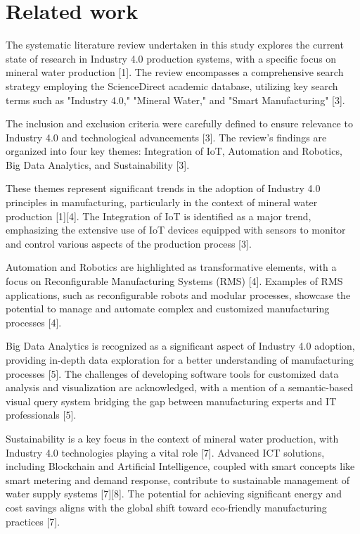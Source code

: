 \documentclass[conference]{IEEEtran}
\begin{document}
\section{Related work}
\label{sec:related_work}
The systematic literature review undertaken in this study explores the current state of research in Industry 4.0 production systems, with a specific focus on mineral water production [1]. The review encompasses a comprehensive search strategy employing the ScienceDirect academic database, utilizing key search terms such as "Industry 4.0," "Mineral Water," and "Smart Manufacturing" [3].

The inclusion and exclusion criteria were carefully defined to ensure relevance to Industry 4.0 and technological advancements [3]. The review's findings are organized into four key themes: Integration of IoT, Automation and Robotics, Big Data Analytics, and Sustainability [3].

These themes represent significant trends in the adoption of Industry 4.0 principles in manufacturing, particularly in the context of mineral water production [1][4]. The Integration of IoT is identified as a major trend, emphasizing the extensive use of IoT devices equipped with sensors to monitor and control various aspects of the production process [3].

Automation and Robotics are highlighted as transformative elements, with a focus on Reconfigurable Manufacturing Systems (RMS) [4]. Examples of RMS applications, such as reconfigurable robots and modular processes, showcase the potential to manage and automate complex and customized manufacturing processes [4].

Big Data Analytics is recognized as a significant aspect of Industry 4.0 adoption, providing in-depth data exploration for a better understanding of manufacturing processes [5]. The challenges of developing software tools for customized data analysis and visualization are acknowledged, with a mention of a semantic-based visual query system bridging the gap between manufacturing experts and IT professionals [5].

Sustainability is a key focus in the context of mineral water production, with Industry 4.0 technologies playing a vital role [7]. Advanced ICT solutions, including Blockchain and Artificial Intelligence, coupled with smart concepts like smart metering and demand response, contribute to sustainable management of water supply systems [7][8]. The potential for achieving significant energy and cost savings aligns with the global shift toward eco-friendly manufacturing practices [7].
\end{document}
